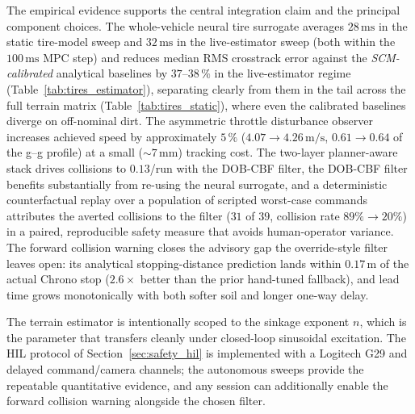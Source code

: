 \documentclass[conference,letterpaper,10pt]{IEEEtran}
\begin{document}
The empirical evidence supports the central integration claim and the principal
component choices. The
whole-vehicle neural tire surrogate averages
$28\,\mathrm{ms}$ in the static tire-model sweep and
$32\,\mathrm{ms}$ in the live-estimator sweep (both within the
$100\,\mathrm{ms}$ MPC step) and reduces median RMS crosstrack error against the
\emph{SCM-calibrated} analytical baselines by $37$--$38\,\%$ in the
live-estimator regime (Table~\ref{tab:tires_estimator}), separating
clearly from them in the tail across the full terrain matrix
(Table~\ref{tab:tires_static}), where even the calibrated baselines
diverge on off-nominal dirt. The asymmetric
throttle disturbance observer increases achieved speed by approximately
$5\,\%$ ($4.07\!\to\!4.26\,\mathrm{m/s}$, $0.61\!\to\!0.64$ of the
g--g profile) at a small (${\sim}7\,\mathrm{mm}$) tracking
cost. The two-layer planner-aware stack drives collisions to $0.13$/run with
the DOB-CBF filter, the DOB-CBF filter benefits substantially from
re-using the neural surrogate, and a deterministic counterfactual replay over a
population of scripted worst-case commands attributes the averted collisions to
the filter ($31$ of $39$, collision rate $89\%\!\to\!20\%$) in a paired,
reproducible safety measure that avoids human-operator variance. The forward
collision warning closes the advisory gap the override-style filter
leaves open: its analytical stopping-distance prediction lands within
$0.17\,\mathrm{m}$ of the actual Chrono stop ($2.6\times$ better than
the prior hand-tuned fallback), and lead time grows monotonically
with both softer soil and longer one-way delay.

The terrain estimator is intentionally scoped to the sinkage exponent
$n$, which is the parameter that transfers cleanly under closed-loop
sinusoidal excitation. The HIL protocol of
Section~\ref{sec:safety_hil} is implemented with a Logitech G29 and
delayed command/camera channels; the autonomous sweeps provide the
repeatable quantitative evidence, and any session can additionally
enable the forward collision warning alongside the chosen filter.
\end{document}

